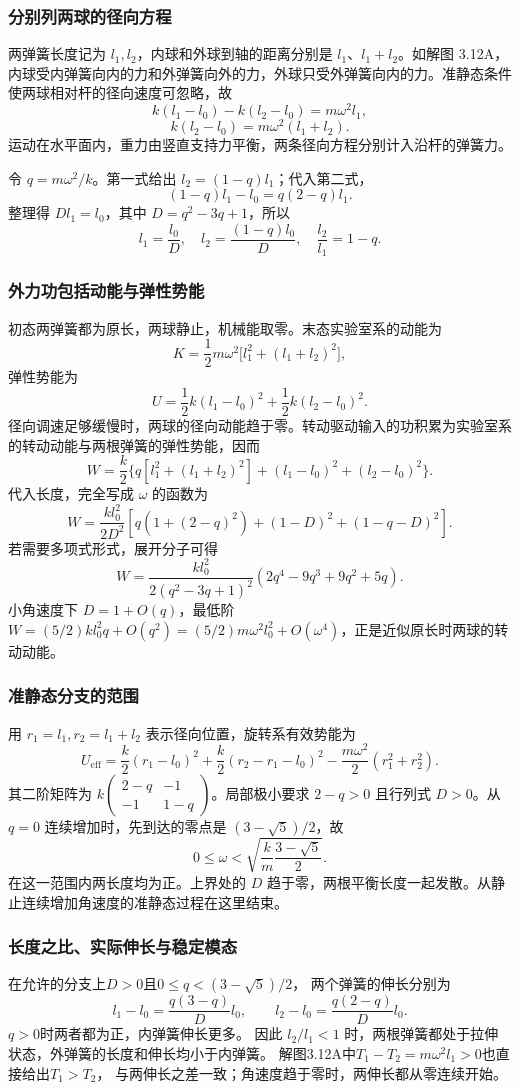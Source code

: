 \documentclass[UTF8,fontset=fandol,a4paper,11pt]{ctexart}
\begin{document}
\subsubsection*{分别列两球的径向方程}
两弹簧长度记为 $l_1,l_2$，内球和外球到轴的距离分别是 $l_1$、$l_1+l_2$。如解图 3.12A，内球受内弹簧向内的力和外弹簧向外的力，外球只受外弹簧向内的力。准静态条件使两球相对杆的径向速度可忽略，故
\[
k(l_1-l_0)-k(l_2-l_0)=m\omega^2l_1,
\]
\[
k(l_2-l_0)=m\omega^2(l_1+l_2).
\]
运动在水平面内，重力由竖直支持力平衡，两条径向方程分别计入沿杆的弹簧力。

令 $q=m\omega^2/k$。第一式给出 $l_2=(1-q)l_1$；代入第二式，
\[
(1-q)l_1-l_0=q(2-q)l_1.
\]
整理得 $D l_1=l_0$，其中 $D=q^2-3q+1$，所以
\[
\boxed{l_1=\frac{l_0}{D},\quad l_2=\frac{(1-q)l_0}{D},
\quad \frac{l_2}{l_1}=1-q}.
\]

\subsubsection*{外力功包括动能与弹性势能}
初态两弹簧都为原长，两球静止，机械能取零。末态实验室系的动能为
\[
K=\frac12m\omega^2\bigl[l_1^2+(l_1+l_2)^2\bigr],
\]
弹性势能为
\[
U=\frac12k(l_1-l_0)^2+\frac12k(l_2-l_0)^2.
\]
径向调速足够缓慢时，两球的径向动能趋于零。转动驱动输入的功积累为实验室系的转动动能与两根弹簧的弹性势能，因而
\[
W=\frac{k}{2}\{q[l_1^2+(l_1+l_2)^2]
+(l_1-l_0)^2+(l_2-l_0)^2\}.
\]
代入长度，完全写成 $\omega$ 的函数为
\[
\boxed{W=\frac{kl_0^2}{2D^2}
\left[q(1+(2-q)^2)+(1-D)^2+(1-q-D)^2\right]}.
\]
若需要多项式形式，展开分子可得
\[
W=\frac{kl_0^2}{2(q^2-3q+1)^2}
\left(2q^4-9q^3+9q^2+5q\right).
\]
小角速度下 $D=1+O(q)$，最低阶 $W=(5/2)kl_0^2q+O(q^2)
=(5/2)m\omega^2l_0^2+O(\omega^4)$，正是近似原长时两球的转动动能。

\subsubsection*{准静态分支的范围}
用 $r_1=l_1,r_2=l_1+l_2$ 表示径向位置，旋转系有效势能为
\[
U_{\mathrm{eff}}=\frac{k}{2}(r_1-l_0)^2
+\frac{k}{2}(r_2-r_1-l_0)^2
-\frac{m\omega^2}{2}(r_1^2+r_2^2).
\]
其二阶矩阵为 $k\begin{pmatrix}2-q&-1\\-1&1-q\end{pmatrix}$。局部极小要求 $2-q>0$ 且行列式 $D>0$。从 $q=0$ 连续增加时，先到达的零点是 $(3-\sqrt5)/2$，故
\[
\boxed{0\leq\omega<
\sqrt{\frac{k}{m}\frac{3-\sqrt5}{2}}}.
\]
在这一范围内两长度均为正。上界处的 $D$ 趋于零，两根平衡长度一起发散。从静止连续增加角速度的准静态过程在这里结束。
\subsubsection*{长度之比、实际伸长与稳定模态}
在允许的分支上$D>0$且$0\leq q<(3-\sqrt5)/2$，
两个弹簧的伸长分别为
\[
l_1-l_0=\frac{q(3-q)}D l_0,
\qquad l_2-l_0=\frac{q(2-q)}D l_0.
\]
$q>0$时两者都为正，内弹簧伸长更多。
因此 $l_2/l_1<1$ 时，两根弹簧都处于拉伸状态，外弹簧的长度和伸长均小于内弹簧。
解图3.12A中$T_1-T_2=m\omega^2l_1>0$也直接给出$T_1>T_2$，
与两伸长之差一致；角速度趋于零时，两伸长都从零连续开始。
\end{document}
